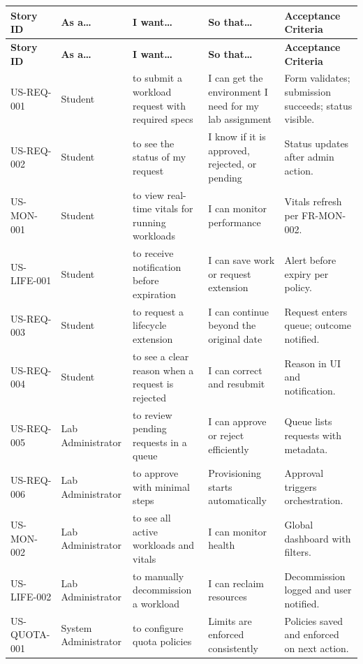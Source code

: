 \documentclass[12pt,a4paper]{article}
\begin{document}
\begin{longtable}{@{}L{2.1cm}L{2.2cm}L{3.6cm}L{3cm}L{3.5cm}@{}}
    \textbf{Story ID} & \textbf{As a\ldots} & \textbf{I want\ldots} & \textbf{So that\ldots} & \textbf{Acceptance Criteria} \\
  \midrule
  \endfirsthead
    \textbf{Story ID} & \textbf{As a\ldots} & \textbf{I want\ldots} & \textbf{So that\ldots} & \textbf{Acceptance Criteria} \\
  \midrule
  \endhead
  \endfoot
  US-REQ-001 & Student & to submit a workload request with required specs & I can get the environment I need for my lab assignment & Form validates; submission succeeds; status visible. \\
  US-REQ-002 & Student & to see the status of my request & I know if it is approved, rejected, or pending & Status updates after admin action. \\
  US-MON-001 & Student & to view real-time vitals for running workloads & I can monitor performance & Vitals refresh per FR-MON-002. \\
  US-LIFE-001 & Student & to receive notification before expiration & I can save work or request extension & Alert before expiry per policy. \\
  US-REQ-003 & Student & to request a lifecycle extension & I can continue beyond the original date & Request enters queue; outcome notified. \\
  US-REQ-004 & Student & to see a clear reason when a request is rejected & I can correct and resubmit & Reason in UI and notification. \\
  US-REQ-005 & Lab Administrator & to review pending requests in a queue & I can approve or reject efficiently & Queue lists requests with metadata. \\
  US-REQ-006 & Lab Administrator & to approve with minimal steps & Provisioning starts automatically & Approval triggers orchestration. \\
  US-MON-002 & Lab Administrator & to see all active workloads and vitals & I can monitor health & Global dashboard with filters. \\
  US-LIFE-002 & Lab Administrator & to manually decommission a workload & I can reclaim resources & Decommission logged and user notified. \\
  US-QUOTA-001 & System Administrator & to configure quota policies & Limits are enforced consistently & Policies saved and enforced on next action. \\

\end{longtable}
\end{document}
